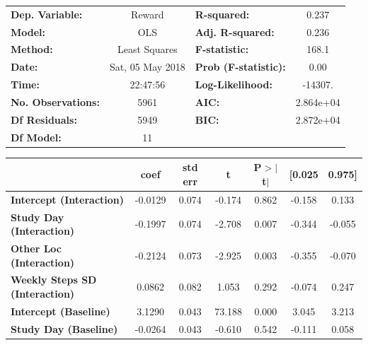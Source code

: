 \begin{table}
\begin{tabular}{lclc}
\toprule
\textbf{Dep. Variable:}                &      Reward       & \textbf{  R-squared:         } &     0.237   \\
\textbf{Model:}                        &       OLS        & \textbf{  Adj. R-squared:    } &     0.236   \\
\textbf{Method:}                       &  Least Squares   & \textbf{  F-statistic:       } &     168.1   \\
\textbf{Date:}                         & Sat, 05 May 2018 & \textbf{  Prob (F-statistic):} &     0.00    \\
\textbf{Time:}                         &     22:47:56     & \textbf{  Log-Likelihood:    } &   -14307.   \\
\textbf{No. Observations:}             &        5961      & \textbf{  AIC:               } & 2.864e+04   \\
\textbf{Df Residuals:}                 &        5949      & \textbf{  BIC:               } & 2.872e+04   \\
\textbf{Df Model:}                     &          11      & \textbf{                     } &             \\
\bottomrule
\end{tabular}
\begin{tabular}{lcccccc}
                                       & \textbf{coef} & \textbf{std err} & \textbf{t} & \textbf{P$>$$|$t$|$} & \textbf{[0.025} & \textbf{0.975]}  \\
\midrule
\textbf{Intercept (Interaction)}       &      -0.0129  &        0.074     &    -0.174  &         0.862        &       -0.158    &        0.133     \\
\textbf{Study Day (Interaction)}       &      -0.1997  &        0.074     &    -2.708  &         0.007        &       -0.344    &       -0.055     \\
\textbf{Other Loc (Interaction)}       &      -0.2124  &        0.073     &    -2.925  &         0.003        &       -0.355    &       -0.070     \\
\textbf{Weekly Steps SD (Interaction)} &       0.0862  &        0.082     &     1.053  &         0.292        &       -0.074    &        0.247     \\
\textbf{Intercept (Baseline)}          &       3.1290  &        0.043     &    73.188  &         0.000        &        3.045    &        3.213     \\
\textbf{Study Day (Baseline)}          &      -0.0264  &        0.043     &    -0.610  &         0.542        &       -0.111    &        0.058     \\

\end{tabular}
\end{table}
